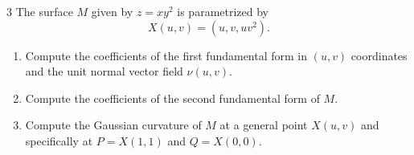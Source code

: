 \documentclass[11pt]{article}
\begin{document}
\begin{problem}{3}
	The surface \( M \) given by \( z = xy^2 \) is parametrized by
	\begin{equation}
		\label{eq:1}
		X(u,v) = (u,v,uv^2).
	\end{equation}
	\begin{enumerate}[label=(\alph*)]
		\item Compute the coefficients of the first fundamental form in \( (u,v) \) coordinates and the unit normal vector field \(\nu(u,v)\).
		\item Compute the coefficients of the second fundamental form of \( M \).
		\item Compute the Gaussian curvature of \( M \) at a general point \( X(u,v) \) and specifically at \( P= X(1,1) \) and \( Q=X(0,0) \).
	\end{enumerate}
\end{problem}
\end{document}
